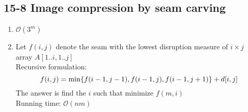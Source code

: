 \subsection*{15-8 Image compression by seam carving}
\begin{enumerate}
	\item	$\mathcal{O}(3^m)$
	\item	Let $f(i, j)$ denote the seam with the lowest disruption measure of $i \times j$ array $A[1..i, 1..j]$ \\
		Recursive formulation:
		\begin{equation} \notag
			f(i, j) = \min\{f(i - 1, j - 1), f(i - 1, j), f(i - 1, j + 1)\} + d[i, j]
		\end{equation}
		The answer is find the $i$ such that minimize $f(m, i)$ \\
		Running time: $\mathcal{O}(nm)$
\end{enumerate}

